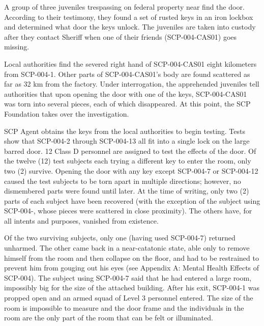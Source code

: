\begin{flushleft}
\end{flushleft}
 A group of three juveniles trespassing on federal property near  find the door. According to their testimony, they found a set of rusted keys in an iron lockbox and determined what door the keys unlock. The juveniles are taken into custody after they contact Sheriff  when one of their friends (SCP-004-CAS01) goes missing.

 Local authorities find the severed right hand of SCP-004-CAS01 eight kilometers from SCP-004-1. Other parts of SCP-004-CAS01's body are found scattered as far as 32 km from the factory. Under interrogation, the apprehended juveniles tell authorities that upon opening the door with one of the keys, SCP-004-CAS01 was torn into several pieces, each of which disappeared. At this point, the SCP Foundation takes over the investigation.

 SCP Agent  obtains the keys from the local authorities to begin testing. Tests show that SCP-004-2 through SCP-004-13 all fit into a single lock on the large barred door. 12 Class D personnel are assigned to test the effects of the door. Of the twelve (12) test subjects each trying a different key to enter the room, only two (2) survive. Opening the door with any key except SCP-004-7 or SCP-004-12 caused the test subjects to be torn apart in multiple directions; however, no dismembered parts were found until later. At the time of writing, only two (2) parts of each subject have been recovered (with the exception of the subject using SCP-004-, whose pieces were scattered in close proximity). The others have, for all intents and purposes, vanished from existence.

Of the two surviving subjects, only one (having used SCP-004-7) returned unharmed. The other came back in a near-catatonic state, able only to remove himself from the room and then collapse on the floor, and had to be restrained to prevent him from gouging out his eyes (see Appendix A: Mental Health Effects of SCP-004). The subject using SCP-004-7 said that he had entered a large room, impossibly big for the size of the attached building. After his exit, SCP-004-1 was propped open and an armed squad of Level 3 personnel entered. The size of the room is impossible to measure and the door frame and the individuals in the room are the only part of the room that can be felt or illuminated.

